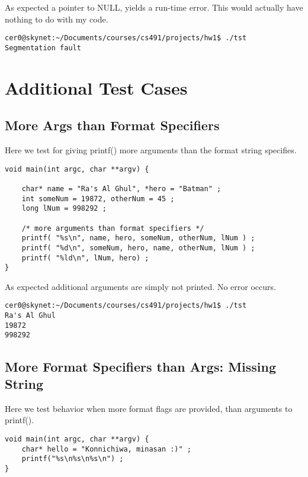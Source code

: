 \documentclass[onecolumn]{article}
\begin{document}
As expected a pointer to NULL, yields a run-time error.
This would actually have nothing to do with my code.
\begin{verbatim}
cer0@skynet:~/Documents/courses/cs491/projects/hw1$ ./tst
Segmentation fault
\end{verbatim}

\section{Additional Test Cases}
\subsection{More Args than Format Specifiers}

Here we test for giving printf() more arguments than
the format string specifies.
\begin{verbatim}
void main(int argc, char **argv) {

	char* name = "Ra's Al Ghul", *hero = "Batman" ;
	int someNum = 19872, otherNum = 45 ;
	long lNum = 998292 ;

	/* more arguments than format specifiers */
	printf( "%s\n", name, hero, someNum, otherNum, lNum ) ;
	printf( "%d\n", someNum, hero, name, otherNum, lNum ) ;
	printf( "%ld\n", lNum, hero) ;
}
\end{verbatim}


As expected additional arguments are simply not printed. 
No error occurs.
\begin{verbatim}
cer0@skynet:~/Documents/courses/cs491/projects/hw1$ ./tst
Ra's Al Ghul
19872
998292
\end{verbatim}

\subsection{More Format Specifiers than Args: Missing String }
Here we test behavior when more format flags are provided, than 
arguments to printf().
\begin{verbatim}
void main(int argc, char **argv) {
	char* hello = "Konnichiwa, minasan :)" ;
	printf("%s\n%s\n%s\n") ;
}
\end{verbatim}
\end{document}
